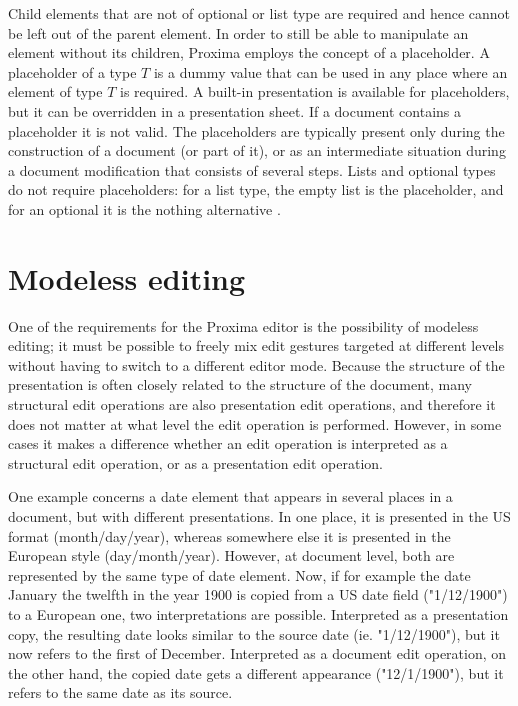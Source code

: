 Child elements that are not of optional or list type are required and hence cannot be left out of the parent element. In order to still be able to manipulate an element without its children, Proxima employs the concept of a placeholder. A placeholder of a type $T$ is a dummy value that can be used in any place where an element of type $T$ is required. A built-in presentation is available for placeholders, but it can be overridden in a presentation sheet. If a document contains a placeholder it is not valid. The placeholders are typically present only during the construction of a document (or part of it), or as an intermediate situation during a document modification that consists of several steps. Lists and optional types do not require placeholders: for a list type, the empty list is the placeholder, and for an optional it is the nothing alternative .

\section{Modeless editing}

One of the requirements for the Proxima editor is the possibility of modeless editing; it must be possible to freely mix edit gestures targeted at different levels without having to switch to a different editor mode. Because the structure of the presentation is often closely related to the structure of the document, many structural edit operations are also presentation edit operations, and therefore it does not matter at what level the edit operation is performed. However, in some cases it makes a difference whether an edit operation is interpreted as a structural edit operation, or as a presentation edit operation.


One example concerns a date element that appears in several places in a document, but with different presentations. In one place, it is presented in the US format (month/day/year), whereas somewhere else it is presented in the European style (day/month/year). However, at document level, both are represented by the same type of date element. Now, if for example the date January the twelfth in the year 1900 is copied from a US date field ("1/12/1900") to a European one, two interpretations are possible. Interpreted as a presentation copy, the resulting date looks similar to the source date (ie. "1/12/1900"), but it now refers to the first of December. Interpreted as a document edit operation, on the other hand, the copied date gets a different appearance ("12/1/1900"), but it refers to the same date as its source.

